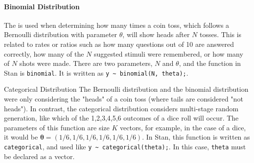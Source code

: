 \documentclass{ltjsbook}
\begin{document}
\paragraph{Binomial Distribution}
The  is used when determining how many times a coin toss, which follows a Bernoulli distribution with parameter $\theta$, will show heads after $N$ tosses. This is related to rates or ratios such as how many questions out of 10 are answered correctly, how many of the $N$ suggested stimuli were remembered, or how many of $N$ shots were made. There are two parameters, $N$ and $\theta$, and the function in Stan is \texttt{binomial}. It is written as \verb|y ~ binomial(N, theta);|.

Categorical Distribution
The Bernoulli distribution and the binomial distribution were only considering the "heads" of a coin toss (where tails are considered "not heads"). In contrast, the categorical distribution considers multi-stage random generation, like which of the 1,2,3,4,5,6 outcomes of a dice roll will occur. The parameters of this function are size $K$ vectors, for example, in the case of a dice, it would be $\bm{\theta}=(1/6,1/6,1/6,1/6,1/6,1/6)$. In Stan, this function is written as \texttt{categorical}, and used like \verb|y ~ categorical(theta);|. In this case, \verb|theta| must be declared as a vector.
\end{document}
